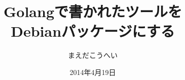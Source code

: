 




\documentclass[cjk,dvipdfmx,12pt]{beamer}
\usepackage{monthlypresentation}
\usepackage{listings}



\title{Golangで書かれたツールを\\Debianパッケージにする}
\subtitle{}
\author{まえだこうへい}
\date{2014年4月19日}


